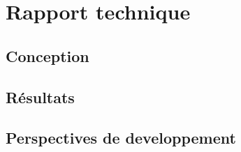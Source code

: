 \chapter{Rapport technique}


\section{Conception}






\section{Résultats}






\section{Perspectives de developpement}